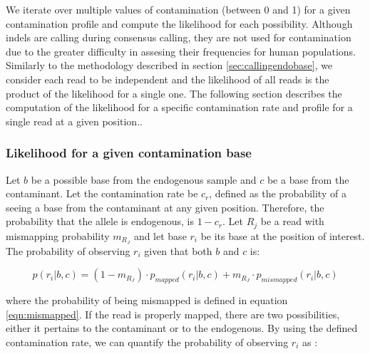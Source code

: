 \documentclass[a4paper,12pt]{article}
\begin{document}
We iterate over multiple values of contamination (between 0 and 1) for a given contamination profile and compute the likelihood for each possibility. Although indels are calling during consensus calling, they are not used for contamination due to the greater difficulty in assesing their frequencies for human populations. Similarly to the methodology described in section \ref{sec:callingendobase}, we consider each read to be independent and the likelihood of all reads is the product of the likelihood for a single one. The following section describes the computation of the likelihood for a specific contamination rate and profile for a single read at a given position.. 


\subsubsection{Likelihood for a given contamination base}

Let $b$ be a possible base from the endogenous sample and $c$ be a base from the contaminant. Let the contamination rate be $c_r$, defined as the probability of a seeing a base from the contaminant at any given position. Therefore, the probability that the allele is endogenous, is $1-c_r$. Let $R_j$ be a read with mismapping probability $m_{R_J}$ and let base $r_i$ be its base at the position of interest. The probability of observing $r_i$ given that both $b$ and $c$ is:

\begin{equation}
p(r_i|b,c)  = (1-m_{R_J}) \cdot p_{mapped}(r_i|b,c) + m_{R_J} \cdot p_{mismapped}(r_i|b,c)  
\label{eqn:singlereadcont}
\end{equation}

\noindent where the probability of being mismapped is defined in equation \ref{eqn:mismapped}. If the read is properly mapped, there are two possibilities, either it pertains to the contaminant or to the endogenous. By using the defined contamination rate, we can quantify the probability of observing $r_i$ as :
\end{document}

